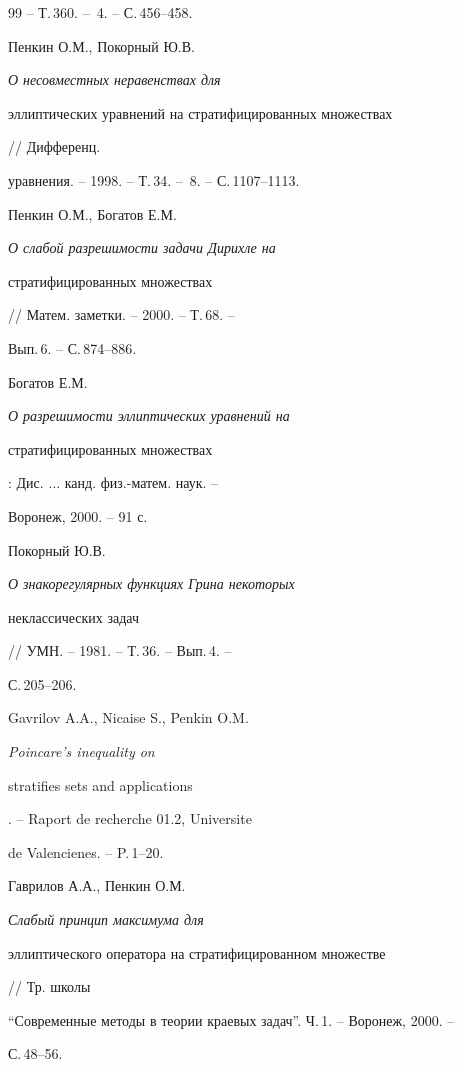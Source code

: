 \begin{thebibliography}{99}
-- Т.\,360. -- \No\,4. -- С.\,456--458. 




Пенкин О.М., Покорный Ю.В. {\em О несовместных неравенствах для 


эллиптических уравнений на стратифицированных множествах} // Дифференц. 


уравнения. -- 1998. -- Т.\,34. -- \No\,8. -- С.\,1107--1113. 




Пенкин О.М., Богатов Е.М. {\em О слабой разрешимости задачи Дирихле на 


стратифицированных множествах} // Матем. заметки. -- 2000. -- Т.\,68. -- 


Вып.\,6. -- С.\,874--886. 




Богатов Е.М. {\em О разрешимости эллиптических уравнений на 


стратифицированных множествах}: Дис. $\dotsc$ канд. физ.-матем. наук. -- 


Воронеж, 2000. -- 91 с. 




Покорный Ю.В. {\em О знакорегулярных функциях Грина некоторых 


неклассических задач} // УМН. -- 1981. -- Т.\,36. -- Вып.\,4. -- 


С.\,205--206. 




Gavrilov A.A., Nicaise S., Penkin O.M. {\em Poincare's inequality on 


stratifies sets and applications}. -- Raport de recherche 01.2, Universite 


de Valencienes. -- P.\,1--20. 




Гаврилов А.А., Пенкин О.М. {\em Слабый принцип максимума для 


эллиптического оператора на стратифицированном множестве} // Тр. школы 


``Современные методы в теории краевых задач''. Ч.\,1. -- Воронеж, 2000. -- 


С.\,48--56. 


 


 


\end{thebibliography} 


 


